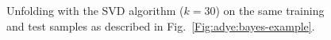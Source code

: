 \documentclass{cernrep}
\begin{document}
\begin{figure}
%
\caption{Unfolding with the SVD algorithm ($k=30$) on
the same training and test samples as described in
Fig.~\ref{Fig:adye:bayes-example}.}\label{Fig:adye:svd-example}
\end{figure}%
\end{document}
